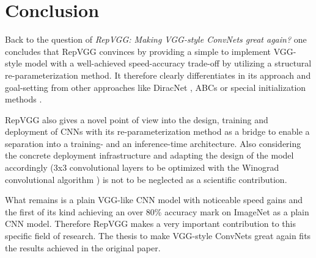 \section{Conclusion} \label{conclusion}

Back to the question of \textit{RepVGG: Making VGG-style ConvNets great again?} one concludes that RepVGG convinces by providing a simple to implement VGG-style model with a well-achieved speed-accuracy trade-off by utilizing a structural re-parameterization method. It therefore clearly differentiates in its approach and goal-setting from other approaches like DiracNet \cite{SergeyZagoruyko.2018}, ABCs \cite{XiaohanDing.2019} or special initialization methods \cite{LechaoXiao.2018, OyebadeOyedotun.2020}. 

RepVGG also gives a novel point of view into the design, training and deployment of CNNs with its re-parameterization method as a bridge to enable a separation into a training- and an inference-time architecture. Also considering the concrete deployment infrastructure and adapting the design of the model accordingly (3x3 convolutional layers to be optimized with the Winograd convolutional algorithm \cite{AndrewLavin.2015}) is not to be neglected as a scientific contribution. 

What remains is a plain VGG-like CNN model with noticeable speed gains and the first of its kind achieving an over 80\% accuracy mark on ImageNet \cite{JiaDeng.2009} as a plain CNN model. Therefore RepVGG makes a very important contribution to this specific field of research. The thesis to make VGG-style ConvNets great again fits the results achieved in the original paper. 

